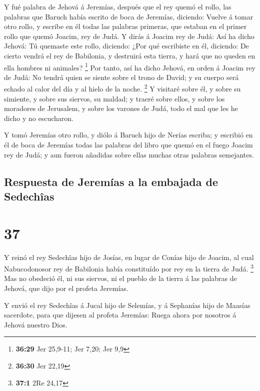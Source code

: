  Y fué palabra de Jehová á Jeremías, después que el rey
quemó el rollo, las palabras que Baruch había escrito de boca de
Jeremías, diciendo:  Vuelve á tomar otro rollo, y escribe
en él todas las palabras primeras, que estaban en el primer rollo que
quemó Joacim, rey de Judá.  Y dirás á Joacim rey de Judá:
Así ha dicho Jehová: Tú quemaste este rollo, diciendo: ¿Por qué
escribiste en él, diciendo: De cierto vendrá el rey de Babilonia, y
destruirá esta tierra, y hará que no queden en ella hombres ni animales?
\footnote{\textbf{36:29} Jer 25,9-11; Jer 7,20; Jer 9,9} 
Por tanto, así ha dicho Jehová, en orden á Joacim rey de Judá: No tendrá
quien se siente sobre el trono de David; y su cuerpo será echado al
calor del día y al hielo de la noche. \footnote{\textbf{36:30} Jer 22,19}
 Y visitaré sobre él, y sobre su simiente, y sobre sus
siervos, su maldad; y traeré sobre ellos, y sobre los moradores de
Jerusalem, y sobre los varones de Judá, todo el mal que les he dicho y
no escucharon.

 Y tomó Jeremías otro rollo, y diólo á Baruch hijo de
Nerías escriba; y escribió en él de boca de Jeremías todas las palabras
del libro que quemó en el fuego Joacim rey de Judá; y aun fueron
añadidas sobre ellas muchas otras palabras semejantes.

\hypertarget{respuesta-de-jeremuxedas-a-la-embajada-de-sedechuxeeas}{%
\subsection{Respuesta de Jeremías a la embajada de
Sedechîas}\label{respuesta-de-jeremuxedas-a-la-embajada-de-sedechuxeeas}}

\hypertarget{section-36}{%
\section{37}\label{section-36}}

 Y reinó el rey Sedechîas hijo de Josías, en lugar de Conías
hijo de Joacim, al cual Nabucodonosor rey de Babilonia había constituído
por rey en la tierra de Judá. \footnote{\textbf{37:1} 2Re 24,17}
 Mas no obedeció él, ni sus siervos, ni el pueblo de la
tierra á las palabras de Jehová, que dijo por el profeta Jeremías.

 Y envió el rey Sedechîas á Jucal hijo de Selemías, y á
Sephanías hijo de Maasías sacerdote, para que dijesen al profeta
Jeremías: Ruega ahora por nosotros á Jehová nuestro Dios.

